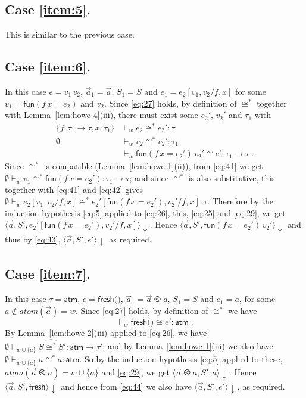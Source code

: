 \documentclass{LMCS}
\theoremstyle{plain}
\theoremstyle{definition}
\newcommand{\atm}[1][a]{#1}
\newcommand{\ATM}{\kw{atm}}
\newcommand{\atoms}{\mathit{atom}}
\newcommand{\config}[3]{\langle#1, #2, #3\rangle}
\newcommand{\CR}[1]{\mathrel{\widehat{#1}}}
\newcommand{\ent}{\vdash}
\newcommand{\EQ}{\mathbin{\kw{=}}}
\renewcommand{\exp}[1][e]{#1}
\newcommand{\FRESH}{\kw{fresh}}
\newcommand{\FUN}{\kw{fun}}
\newcommand{\FUNTY}{\mathbin{\rightarrow}}
\newcommand{\LP}{\mathopen{\kw{(}}}
\newcommand{\kw}[1]{\mathsf{#1}}
\newcommand{\ofty}{:}
\newcommand{\opeq}{\cong}
\newcommand{\ords}{\olessthan}\newcommand{\PAIR}[2]{\LP#1\mathbin{\kw{,}}#2\RP}
\newcommand{\RP}{\mathclose{\kw{)}}}
\newcommand{\s}[1][a]{\vec{#1}}
\newcommand{\stk}[1][S]{#1}
\newcommand{\sub}[2]{{[#2/#1]}}
\newcommand{\terminates}[1][]{{\downarrow_{#1}}}
\newcommand{\ty}{\tau}
\newcommand{\UNITVAL}{\LP\RP}
\newcommand{\val}[1][v]{#1}
\newcommand{\vid}[1][x]{#1}
\newcommand{\w}[1][w]{#1}
\begin{document}
  \subsection*{Case \ref{item:5}.} This is similar to the previous
  case.

  \subsection*{Case \ref{item:6}.} In this case $\exp=\val_1\,\val_2$,
  $\s_1=\s$, $\stk_1=\stk$ and
  $\exp_1=\exp_2\sub{\vid[f],\vid}{\val_1,\val_2}$ for some
  $\val_1=\FUN(\vid[f]\,\vid\EQ \exp_2)$ and $\val_2$. Since
  \eqref{eq:27} holds, by definition of $\opeq^*$ together with
  Lemma~\ref{lem:howe-4}(iii), there must exist some $\exp_2'$,
  $\val_2'$ and $\ty_1$ with
  \begin{align}
    \{\vid[f]\ofty\ty_1\FUNTY\ty, \vid\ofty\ty_1\} &\ent_{\w}
    \exp_2\opeq^* \exp_2'\ofty\ty \label{eq:41}\\
    \emptyset &\ent_{\w} \val_2\opeq^* \val_2'\ofty\ty_1 \label{eq:42}\\
    {} &\ent_{\w} \FUN(\vid[f]\,\vid\EQ \exp_2')\,\val_2' \opeq
    \exp'\ofty\ty_1\FUNTY\ty\;. \label{eq:43}
  \end{align}
  Since $\opeq^*$ is compatible (Lemma~\ref{lem:howe-1}(ii)), from
  \eqref{eq:41} we get $\emptyset\ent_{\w} \val_1\opeq^*
  \FUN(\vid[f]\,\vid\EQ \exp_2') \ofty \ty_1\FUNTY\ty$; and since
  $\opeq^*$ is also substitutive, this together with \eqref{eq:41} and
  \eqref{eq:42} gives $\emptyset\ent_{\w}
  \exp_2\sub{\vid[f],\vid}{\val_1,\val_2} \opeq^*
  \exp_2'\sub{\vid[f],\vid}{\FUN(\vid[f]\,\vid\EQ \exp_2'), \val_2'}
  \ofty \ty$. Therefore by the induction hypothesis \eqref{eq:5}
  applied to \eqref{eq:26}, this, \eqref{eq:25} and \eqref{eq:29}, we
  get
  $\config{\s}{\stk'}{\exp_2'\sub{\vid[f],\vid}{\FUN(\vid[f]\,\vid\EQ
      \exp_2'), \val_2'}}\terminates$.  Hence
  $\config{\s}{\stk'}{\FUN(\vid[f]\,\vid \EQ
    \exp_2')\,\val_2'}\terminates$ and thus by \eqref{eq:43},
  $\config{\s}{\stk'}{\exp'}\terminates$ as required.

  \subsection*{Case \ref{item:7}.} In this case $\ty=\ATM$,
  $\exp=\FRESH\UNITVAL$, $\s_1=\s\ords\atm$, $\stk_1=\stk$ and
  $\exp_1=\atm$, for some $\atm\notin\atoms(\s)=\w$. Since
  \eqref{eq:27} holds, by definition of $\opeq^*$ we have
  \begin{equation}
   \label{eq:44}
    {}\ent_{\w} \FRESH\UNITVAL\opeq \exp'\ofty\ATM\;.
  \end{equation}
  By Lemma~\ref{lem:howe-2}(iii) applied to \eqref{eq:26}, we have
  $\emptyset\ent_{\w\cup \{\atm\}}\stk\CR{\opeq^*}
  \stk'\ofty\ATM\FUNTY\ty'$; and by Lemma~\ref{lem:howe-1}(iii) we
  also have $\emptyset\ent_{\w\cup\{\atm\}} \atm\opeq^*
  \atm\ofty\ATM$. So by the induction hypothesis \eqref{eq:5} applied
  to these, $\atoms(\s\ords\atm)=\w\cup\{\atm\}$ and \eqref{eq:29}, we
  get $\config{\s\ords a}{\stk'}{\atm}\terminates$.  Hence
  $\config{\s}{\stk'}{\FRESH}\terminates$ and hence from \eqref{eq:44}
  we also have $\config{\s}{\stk'}{e'}\terminates$, as required.
\end{document}
